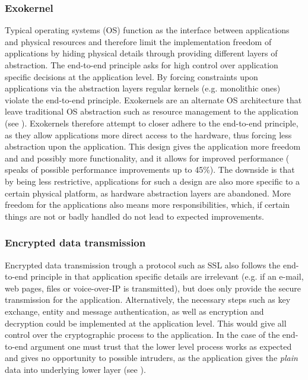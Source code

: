\documentclass[12pt,a4paper,fleqn]{article}
\begin{document}
\subsubsection*{Exokernel}

Typical operating systems (OS) function as the interface between applications and physical resources and therefore limit the implementation freedom of applications by hiding physical details through providing different layers of abstraction. The end-to-end principle asks for high control over application specific decisions at the application level. By forcing constraints upon applications via the abstraction layers regular kernels (e.g. monolithic ones) violate the end-to-end principle. Exokernels are an alternate OS architecture that leave traditional OS abstraction such as resource management to the application (see \cite{Engler1995}). Exokernels therefore attempt to closer adhere to the end-to-end principle, as they allow applications more direct access to the hardware, thus forcing less abstraction upon the application. This design gives the application more freedom and and possibly more functionality, and it allows for improved performance (\cite{Engler1995} speaks of possible performance improvements up to 45\%). The downside is that by being less restrictive, applications for such a design are also more specific to a certain physical platform, as hardware abstraction layers are abandoned. More freedom for the applications also means more responsibilities, which, if certain things are not or badly handled do not lead to expected improvements.

\subsubsection*{Encrypted data transmission}

Encrypted data transmission trough a protocol such as SSL also follows the end-to-end principle in that application specific details are irrelevant (e.g. if an e-mail, web pages, files or voice-over-IP is transmitted), but does only provide the secure transmission for the application. Alternatively, the necessary steps such as key exchange, entity and message authentication, as well as encryption and decryption could be implemented at the application level. This would give all control over the cryptographic process to the application. In the case of the end-to-end argument one must trust that the lower level process works as expected and gives no opportunity to possible intruders, as the application gives the \emph{plain} data into underlying lower layer (see \cite{Saltzer1984}).
\end{document}
